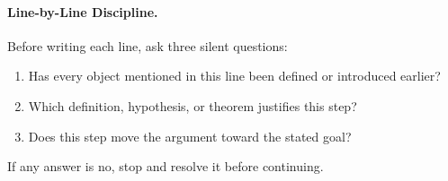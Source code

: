 \paragraph{Line-by-Line Discipline.}

Before writing each line, ask three silent questions:
\begin{enumerate}[label=(\roman*), itemsep=2pt]
  \item Has every object mentioned in this line been defined or introduced earlier?
  \item Which definition, hypothesis, or theorem justifies this step?
  \item Does this step move the argument toward the stated goal?
\end{enumerate}
If any answer is no, stop and resolve it before continuing.
